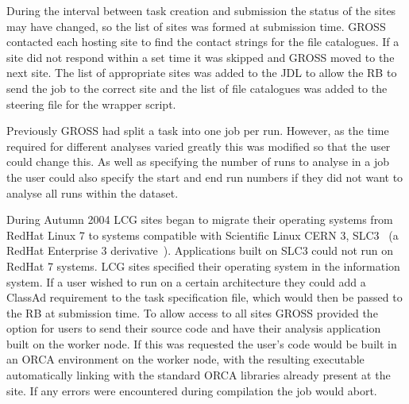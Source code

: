 During the interval between task creation and submission the status of the sites may have changed, so the list of sites was formed at submission time. GROSS contacted each hosting site to find the contact strings for the file catalogues. If a site did not respond within a set time it was skipped and GROSS moved to the next site. The list of appropriate sites was added to the JDL to allow the RB to send the job to the correct site and the list of file catalogues was added to the steering file for the wrapper script.

Previously GROSS had split a task into one job per run. However, as the time required for different analyses varied greatly this was modified so that the user could change this. As well as specifying the number of runs to analyse in a job the user could also specify the start and end run numbers if they did not want to analyse all runs within the dataset.

During Autumn 2004 LCG sites began to migrate their operating systems from RedHat Linux 7 to systems compatible with Scientific Linux CERN 3, SLC3~\cite{SLC3} (a RedHat Enterprise 3 derivative~\cite{RHEL}). Applications built on SLC3 could not run on RedHat 7 systems. LCG sites specified their operating system in the information system. If a user wished to run on a certain architecture they could add a ClassAd requirement to the task specification file, which would then be passed to the RB at submission time. To allow access to all sites GROSS provided the option for users to send their source code and have their analysis application built on the worker node. If this was requested the user's code would be built in an ORCA environment on the worker node, with the resulting executable automatically linking with the standard ORCA libraries already present at the site. If any errors were encountered during compilation the job would abort.

